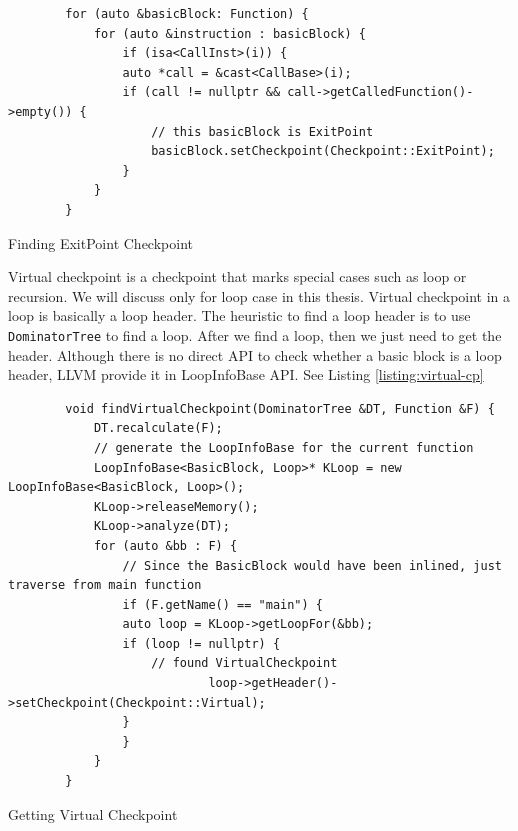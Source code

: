 \begin{listing}[htbp]
    \begin{verbatim}
        for (auto &basicBlock: Function) {
            for (auto &instruction : basicBlock) {
                if (isa<CallInst>(i)) {
                auto *call = &cast<CallBase>(i);
                if (call != nullptr && call->getCalledFunction()->empty()) {
                    // this basicBlock is ExitPoint
                    basicBlock.setCheckpoint(Checkpoint::ExitPoint);
                } 
            }
        } 
    \end{verbatim}
    \caption{Finding ExitPoint Checkpoint}    
    \label{listing:exit-point-cp}
\end{listing}

Virtual checkpoint is a checkpoint that marks special cases such as loop or
recursion. We will discuss only for loop case in this thesis. Virtual checkpoint
in a loop is basically a loop header. The heuristic to find a loop header is to
use \texttt{DominatorTree} to find a loop. After we find a loop, then we just
need to get the header. Although there is no direct API to check whether a basic
block is a loop header, LLVM provide it in LoopInfoBase API. See Listing
\ref{listing:virtual-cp}

\begin{listing}[htbp]
    \begin{verbatim}
        void findVirtualCheckpoint(DominatorTree &DT, Function &F) {
            DT.recalculate(F);
            // generate the LoopInfoBase for the current function
            LoopInfoBase<BasicBlock, Loop>* KLoop = new LoopInfoBase<BasicBlock, Loop>();
            KLoop->releaseMemory();
            KLoop->analyze(DT);
            for (auto &bb : F) {
                // Since the BasicBlock would have been inlined, just traverse from main function
                if (F.getName() == "main") {
                auto loop = KLoop->getLoopFor(&bb);
                if (loop != nullptr) {
                    // found VirtualCheckpoint
                            loop->getHeader()->setCheckpoint(Checkpoint::Virtual);
                }
                }
            }
        }
    \end{verbatim}
    \caption{Getting Virtual Checkpoint}
    \label{listing:virtual-cp}
\end{listing}



